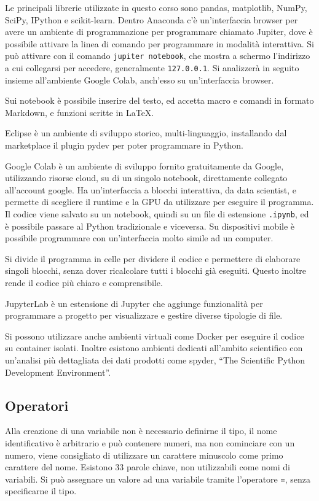 \documentclass{article}
\numberwithin{equation}{subsection}
\begin{document}
Le principali librerie utilizzate in questo corso sono pandas, matplotlib, NumPy, SciPy, IPython e scikit-learn. 
Dentro Anaconda c'è un'interfaccia browser per avere un ambiente di programmazione per programmare chiamato Jupiter, dove è 
possibile attivare la linea di comando per programmare in modalità interattiva. Si può attivare con il comando \verb|jupiter notebook|, 
che mostra a schermo l'indirizzo a cui collegarsi per accedere, generalmente \verb|127.0.0.1|. Si analizzerà in seguito insieme 
all'ambiente Google Colab, anch'esso su un'interfaccia browser. 

Sui notebook è possibile inserire del testo, ed accetta macro e comandi in formato Markdown, e funzioni scritte in LaTeX. 

Eclipse è un ambiente di sviluppo storico, multi-linguaggio, installando dal marketplace il plugin pydev per poter programmare in 
Python. 

Google Colab è un ambiente di sviluppo fornito gratuitamente da Google, utilizzando risorse cloud, su di un singolo 
notebook, direttamente collegato all'account google. 
Ha un'interfaccia a blocchi interattiva, da data scientist, e permette di scegliere il runtime e la GPU da utilizzare per 
eseguire il programma. Il codice viene salvato su un notebook, quindi su un file di estensione \verb|.ipynb|, ed è possibile 
passare al Python tradizionale e viceversa. Su dispositivi mobile è possibile programmare con un'interfaccia molto simile ad un 
computer. 

Si divide il programma in celle per dividere il codice e permettere di elaborare singoli blocchi, senza dover ricalcolare 
tutti i blocchi già eseguiti. Questo inoltre rende il codice più chiaro e comprensibile. 

JupyterLab è un estensione di Jupyter che aggiunge funzionalità per programmare a progetto per visualizzare e gestire diverse 
tipologie di file. 


Si possono utilizzare anche ambienti virtuali come Docker per eseguire il codice su container isolati. 
Inoltre esistono ambienti dedicati all'ambito scientifico con un'analisi più dettagliata dei dati prodotti come spyder, ``The Scientific 
Python Development Environment''. 

\subsection{Operatori}

Alla creazione di una variabile non 
è necessario definirne il tipo, il nome identificativo è arbitrario e può contenere numeri, ma non cominciare con un numero, viene consigliato di utilizzare un carattere 
minuscolo come primo carattere del nome. Esistono 33 parole chiave, non utilizzabili come nomi di variabili. Si può assegnare un valore ad una variabile tramite l'operatore 
\verb|=|, senza specificarne il tipo. 
\end{document}
